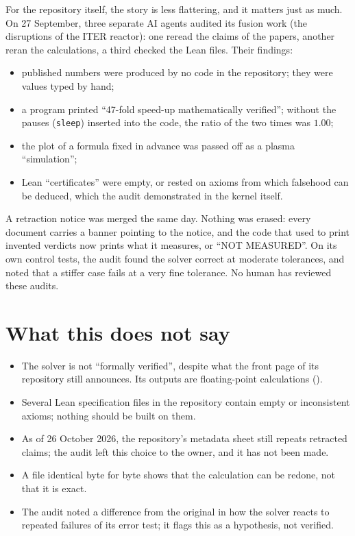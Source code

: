 For the repository itself, the story is less flattering, and it matters just as much. On 27 September, three
separate AI agents audited its fusion work (the disruptions of the ITER reactor): one reread the claims of the
papers, another reran the calculations, a third checked the Lean files. Their findings:
\begin{itemize}
\item published numbers were produced by no code in the repository; they were values typed by hand;
\item a program printed ``47-fold speed-up mathematically verified''; without the pauses (\texttt{sleep})
  inserted into the code, the ratio of the two times was $1.00$;
\item the plot of a formula fixed in advance was passed off as a plasma ``simulation'';
\item Lean ``certificates'' were empty, or rested on axioms from which falsehood can be deduced, which the audit
  demonstrated in the kernel itself.
\end{itemize}
A retraction notice was merged the same day. Nothing was erased: every document carries a banner pointing to the
notice, and the code that used to print invented verdicts now prints what it measures, or ``NOT MEASURED''. On its
own control tests, the audit found the solver correct at moderate tolerances, and noted that a stiffer case fails
at a very fine tolerance. No human has reviewed these audits.

\section*{What this does not say}

\begin{limite}
\begin{itemize}
\item The solver is not ``formally verified'', despite what the front page of its repository still announces.
  Its outputs are floating-point calculations ().
\item Several Lean specification files in the repository contain empty or inconsistent axioms; nothing should be
  built on them.
\item As of 26 October 2026, the repository's metadata sheet still repeats retracted claims; the audit left this
  choice to the owner, and it has not been made.
\item A file identical byte for byte shows that the calculation can be redone, not that it is exact.
\item The audit noted a difference from the original in how the solver reacts to repeated failures of its error
  test; it flags this as a hypothesis, not verified.
\end{itemize}
\end{limite}

